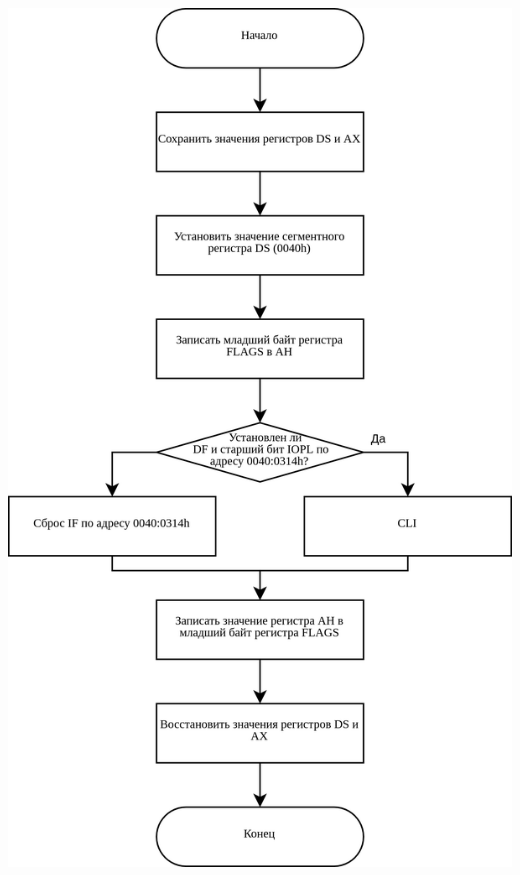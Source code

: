\documentclass[a4paper,12pt]{article}
\begin{document}
\begin{center}
	\includegraphics[height=0.98\textheight]{flowchart/subroutine.png}
\end{center}

\end{document}
